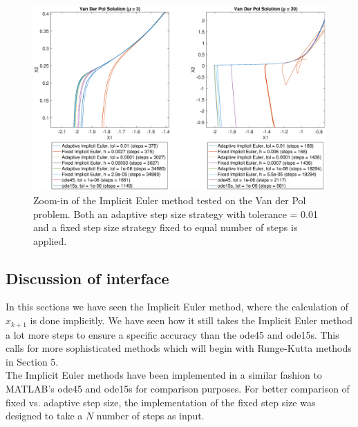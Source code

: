 \begin{figure}
    \centering
    \includegraphics[width=\textwidth]{plots/3_4main_zoom.eps}
    \caption{Zoom-in of the Implicit Euler method tested on the Van der Pol problem. Both an adaptive step size strategy with tolerance = 0.01 and a fixed step size strategy fixed to equal number of steps is applied.}
    \label{fig:3_4b}
\end{figure}




\subsection{Discussion of interface}
In this sections we have seen the Implicit Euler method, where the calculation of $x_{k+1}$ is done implicitly. We have seen how it still takes the Implicit Euler method a lot more steps to ensure a specific accuracy than the ode45 and ode15s. This calls for more sophisticated methods which will begin with Runge-Kutta methods in Section 5.
\\
The Implicit Euler methods have been implemented in a similar fashion to MATLAB's ode45 and ode15s for comparison purposes. For better comparison of fixed vs. adaptive step size, the implementation of the fixed step size was designed to take a $N$ number of steps as input.

